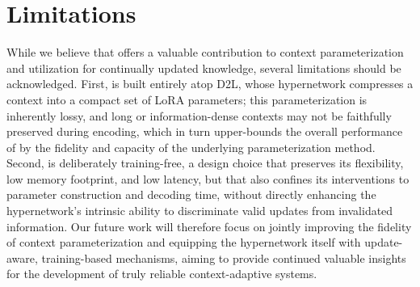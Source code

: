\section*{Limitations}
\label{sec:limitations}

While we believe that \method{} offers a valuable contribution to context parameterization and utilization for continually updated knowledge, several limitations should be acknowledged. First, \method{} is built entirely atop D2L, whose hypernetwork compresses a context into a compact set of LoRA parameters; this parameterization is inherently lossy, and long or information-dense contexts may not be faithfully preserved during encoding, which in turn upper-bounds the overall performance of \method{} by the fidelity and capacity of the underlying parameterization method. Second, \method{} is deliberately training-free, a design choice that preserves its flexibility, low memory footprint, and low latency, but that also confines its interventions to parameter construction and decoding time, without directly enhancing the hypernetwork's intrinsic ability to discriminate valid updates from invalidated information. Our future work will therefore focus on jointly improving the fidelity of context parameterization and equipping the hypernetwork itself with update-aware, training-based mechanisms, aiming to provide continued valuable insights for the development of truly reliable context-adaptive systems.